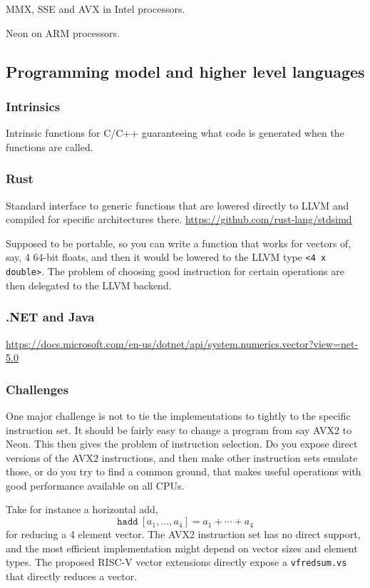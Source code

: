 \documentclass{article}
\begin{document}
MMX, SSE and AVX in Intel processors.

Neon on ARM processors.

\subsection{Programming model and higher level languages}

\subsubsection{Intrinsics}

Intrinsic functions for C/C++ guaranteeing what code is generated when the functions are called.

\subsubsection{Rust}

Standard interface to generic functions that are lowered directly to LLVM and compiled for specific architectures there.
\url{https://github.com/rust-lang/stdsimd}

Supposed to be portable, so you can write a function that works for vectors of, say, 4 64-bit floats, and then it would be lowered to the LLVM type \verb!<4 x double>!. The problem of choosing good instruction for certain operations are then delegated to the LLVM backend.

\subsubsection{.NET and Java}

\url{https://docs.microsoft.com/en-us/dotnet/api/system.numerics.vector?view=net-5.0}


\subsubsection{Challenges}

One major challenge is not to tie the implementations to tightly to the specific instruction set. It should be fairly easy to change a program from say AVX2 to Neon. This then gives the problem of instruction selection. Do you expose direct versions of the AVX2 instructions, and then make other instruction sets emulate those, or do you try to find a common ground, that makes useful operations with good performance available on all CPUs.

Take for instance a horizontal add,
\[
    \mathtt{hadd}\ [a_1, \ldots, a_4] = a_1 + \cdots + a_4
\]
for reducing a 4 element vector. The AVX2 instruction set has no direct support, and the most efficient implementation might depend on vector sizes and element types. The proposed RISC-V vector extensions directly expose a \texttt{vfredsum.vs} that directly reduces a vector.
\end{document}
